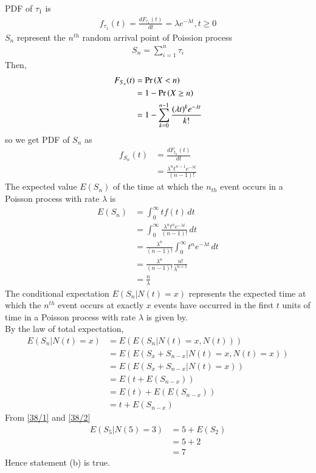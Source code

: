 \documentclass[journal,12pt,onecolumn]{IEEEtran}
\theoremstyle{remark}
\begin{document}
PDF of $\tau_1 $ is
\begin{align}
f_{\tau_1} (t)=\frac{dF_{\tau_1} (t)}{dt}=\lambda e^{-\lambda t}, t\geq 0
\end{align}
$S_n$ represent the $n^{th}$ random arrival point of Poission process\\
\begin{align}
S_n=\sum_{i=1}^{n}\tau_i
\end{align}
Then,
\begin{align}
F_{S_n}(t)&=\Pr\left(X< n\right)\\
&=1-\Pr\left(X\geq n\right)\\
&=1-\sum_{k=0}^{n-1}\frac{(\lambda t)^k e^{-\lambda t}}{k!} 
\end{align}
 so we get PDF of $S_n$ as \\
\begin{align}
f_{S_n}(t)&=\frac{dF_{t_n} (t)}{dt}\\
&=\frac{\lambda^nt^{n-1}e^{-\lambda t}}{(n-1)!}
\end{align}
The expected value $E(S_n)$ of the time at which the $n_{th}$ event occurs in a Poisson process with rate $\lambda$ is\\
\begin{align}
E(S_n)&=\int_{0}^{\infty} tf(t) \, dt\\
&=\int_{0}^{\infty}\frac{\lambda^nt^ne^{-\lambda t}}{(n-1)!}\,dt \\
&=\frac{\lambda^n}{(n-1)!}\int_{0}^{\infty}t^ne^{-\lambda t} \,dt\\
&=\frac{\lambda^n}{(n-1)!}\frac{n!}{\lambda ^{n+1}}\\
&=\frac{n}{\lambda} \label{38/1}
\end{align}
The conditional expectation $E(S_n|N(t)=x)$ represents the expected time at which the $n^{th}$ event occurs at exactly $x$ events have occurred in the first $t$ units of time in a Poisson process with rate $\lambda$ is given by.\\
By the law of total expectation,
\begin{align}
E(S_n | N(t) = x) &= E(E(S_n | N(t) = x, N(t))) \\
&= E(E(S_x + S_{n-x} | N(t) = x, N(t) = x))\\
&= E(E(S_x + S_{n-x} | N(t) = x))\\
&=E(t + E(S_{n-x})) \\
&=E(t) + E(E(S_{n-x}))\\
 &= t + E(S_{n-x}) \label{38/2}
 \end{align}
 From \eqref{38/1} and \eqref{38/2}\\
 \begin{align}
 E(S_5|N(5)=3)&=5+E(S_2)\\
 &=5+2\\
 &=7
 \end{align}
 Hence statement (b) is true.\\
\end{document}
